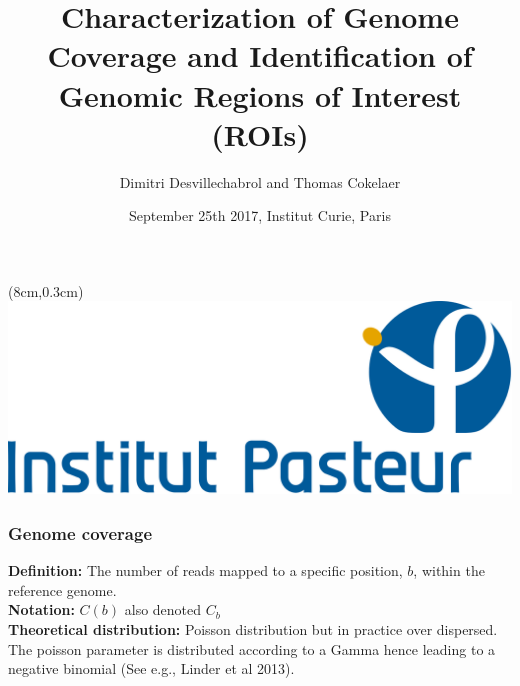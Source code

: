 \documentclass{beamer}
\title[SequanaCoverage]{Characterization of Genome Coverage and Identification 
of Genomic Regions of Interest (ROIs)}
\author[D.Desvillechabrol \& T.Cokelaer]{Dimitri Desvillechabrol and Thomas Cokelaer}
\date{September 25th 2017, Institut Curie, Paris}
\begin{document}
\begin{frame}[plain]
    \titlepage
    \begin{textblock*}{5cm}(8cm,0.3cm)
        \includegraphics[scale=0.09]{../../images/Institut_Pasteur.png}   
    \end{textblock*}
\end{frame}


\begin{frame}
\frametitle{Genome coverage}

\textbf{Definition:} The number of reads mapped to a specific position, $b$, 
within the reference genome. \\
\vspace{1em}
\textbf{Notation:} $ C(b)$ also denoted $C_b$\\
\vspace{1em}
\textbf{Theoretical distribution:} Poisson distribution but in practice over 
dispersed. The poisson parameter is distributed according to a Gamma hence 
leading to a negative binomial (See e.g., Linder et al 2013).
\end{frame}
\end{document}
